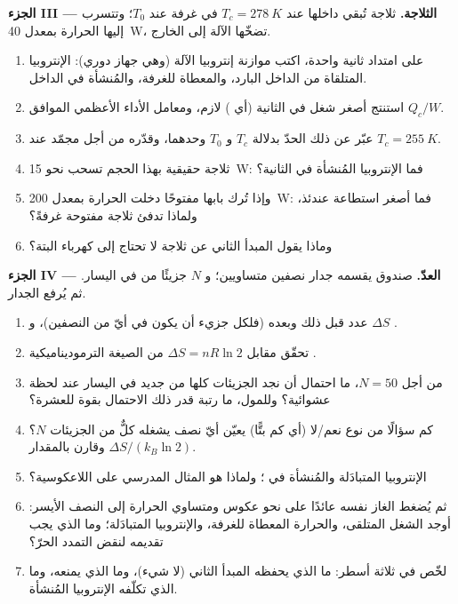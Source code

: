 \begin{problem}
\medskip
\noindent\textbf{الجزء III --- الثلاجة.}
ثلاجة تُبقي داخلها عند $T_c = \qty{278}{K}$ في غرفة عند
$T_0$؛ وتتسرب إليها الحرارة بمعدل \qty{40}{W}، تضخّها الآلة إلى الخارج.
\begin{enumerate}[resume]
  \item على امتداد ثانية واحدة، اكتب موازنة إنتروبيا الآلة (وهي
        جهاز دوري): الإنتروبيا المتلقاة من الداخل البارد، والمعطاة
        للغرفة، والمُنشأة في الداخل.
  \item استنتج أصغر شغل في الثانية (أي ) لازم،
        ومعامل الأداء الأعظمي الموافق
        $Q_c/W$.
  \item عبّر عن ذلك الحدّ بدلالة $T_c$ و $T_0$ وحدهما، وقدّره
        من أجل مجمّد عند $T_c = \qty{255}{K}$.
  \item ثلاجة حقيقية بهذا الحجم تسحب نحو \qty{15}{W}: فما الإنتروبيا
        المُنشأة في الثانية؟
  \item وإذا تُرك بابها مفتوحًا دخلت الحرارة بمعدل \qty{200}{W}:
        فما أصغر استطاعة عندئذ، ولماذا تدفئ ثلاجة مفتوحة غرفةً؟
  \item وماذا يقول المبدأ الثاني عن ثلاجة لا تحتاج إلى كهرباء
        البتة؟
\end{enumerate}

\medskip
\noindent\textbf{الجزء IV --- العدّ.}
صندوق يقسمه جدار نصفين متساويين؛ و $N$ جزيئًا من  في اليسار. ثم يُرفع الجدار.
\begin{enumerate}[resume]
  \item عدد  قبل ذلك وبعده (فلكل جزيء أن يكون في
        أيّ من النصفين)، و $\Delta S$ .
  \item تحقّق مقابل $\Delta S = nR\ln2$ من الصيغة الترموديناميكية
        .
  \item من أجل $N = 50$، ما احتمال أن نجد الجزيئات كلها من جديد في
        اليسار عند لحظة عشوائية؟ وللمول، ما رتبة قدر ذلك
        الاحتمال بقوة للعشرة؟
  \item كم سؤالًا من نوع نعم/لا (أي كم بتًّا) يعيّن أيّ نصف يشغله كلٌّ من
        الجزيئات $N$؟ وقارن بالمقدار $\Delta S/(k_B\ln2)$.
  \item الإنتروبيا المتبادَلة والمُنشأة في ؛ ولماذا هو المثال
        المدرسي على اللاعكوسية؟
  \item ثم يُضغط الغاز نفسه عائدًا على نحو عكوس ومتساوي الحرارة إلى
        النصف الأيسر: أوجد الشغل المتلقى، والحرارة المعطاة للغرفة،
        والإنتروبيا المتبادَلة؛ وما الذي يجب تقديمه لنقض التمدد الحرّ؟
  \item لخّص في ثلاثة أسطر: ما الذي يحفظه المبدأ الثاني (لا شيء)،
        وما الذي يمنعه، وما الذي تكلّفه الإنتروبيا المُنشأة.
\end{enumerate}
\end{problem}
